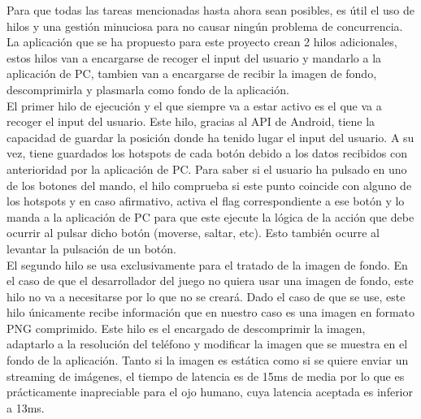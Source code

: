 Para que todas las tareas mencionadas hasta ahora sean posibles, es \'util el uso de hilos y una gesti\'on minuciosa para no causar ning\'un problema de concurrencia.
\\
La aplicaci\'on que se ha propuesto para este proyecto crean 2 hilos adicionales, estos hilos van a encargarse de recoger el input del usuario y mandarlo a la aplicaci\'on de PC, tambien van a encargarse de recibir la imagen de fondo, descomprimirla y plasmarla como fondo de la aplicaci\'on. 
\\
El primer hilo de ejecuci\'on y el que siempre va a estar activo es el que va a recoger el input del usuario. Este hilo, gracias al API de Android, tiene la capacidad de guardar la posici\'on donde ha tenido lugar el input del usuario. A su vez, tiene guardados los hotspots de cada bot\'on debido a los datos recibidos con anterioridad por la aplicaci\'on de PC. Para saber si el usuario ha pulsado en uno de los botones del mando, el hilo comprueba si este punto coincide con alguno de los hotspots y en caso afirmativo, activa el flag correspondiente a ese bot\'on y lo manda a la aplicaci\'on de PC para que este ejecute la l\'ogica de la acci\'on que debe ocurrir al pulsar dicho bot\'on (moverse, saltar, etc). Esto tambi\'en ocurre al levantar la pulsaci\'on de un bot\'on.
\\
El segundo hilo se usa exclusivamente para el tratado de la imagen de fondo. En el caso de que el desarrollador del juego no quiera usar una imagen de fondo, este hilo no va a necesitarse por lo que no se crear\'a. Dado el caso de que se use, este hilo \'unicamente recibe informaci\'on que en nuestro caso es una imagen en formato PNG comprimido. Este hilo es el encargado de descomprimir la imagen, adaptarlo a la resoluci\'on del tel\'efono y modificar la imagen que se muestra en el fondo de la aplicaci\'on. Tanto si la imagen es est\'atica como si se quiere enviar un streaming de im\'agenes, el tiempo de latencia es de 15ms de media por lo que es pr\'acticamente inapreciable para el ojo humano, cuya latencia aceptada es inferior a 13ms.

